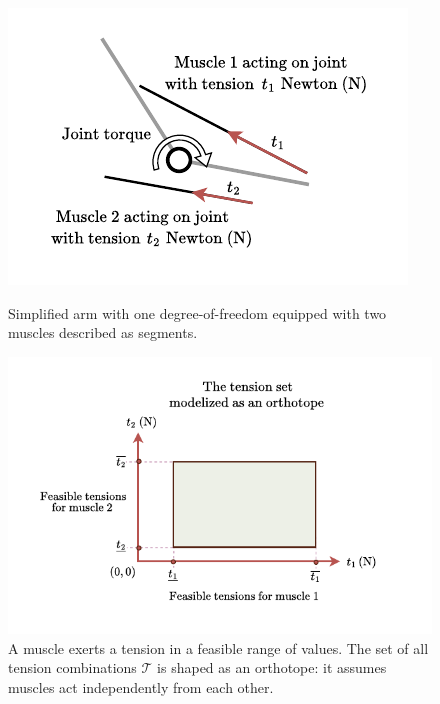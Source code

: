 \begin{figure}[!htb]
    \captionsetup{justification=centering}
    \begin{minipage}{0.39\linewidth}
        \centering
        \includegraphics[trim={20 0 20 0}, clip, width=1\linewidth]{img/chapter_2/joint_torque_simple_2D.pdf}
        \caption{Simplified arm with one degree-of-freedom equipped with two muscles described as segments.}
        \label{fig:joint_torque_simple_2D}
    \end{minipage}
    \hfill
    \begin{minipage}{0.59\linewidth}
        \centering
        \includegraphics[trim={25 20 40 16}, clip, width=0.98\linewidth]{img/chapter_2/tension_set_orthotope.pdf}
        \caption{A muscle exerts a tension in a feasible range of values. The set of all tension combinations $\mathcal{T}$ is shaped as an orthotope: it assumes muscles act independently from each other.}
        \label{fig:tension_set_orthotope}
    \end{minipage}
\end{figure}

